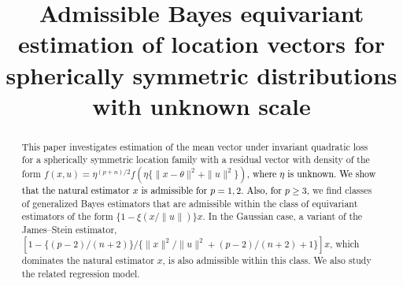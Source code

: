 \documentclass[preprint,11pt]{imsart}
\numberwithin{equation}{section}
\theoremstyle{plain}
\theoremstyle{definition}
\theoremstyle{remark}
\newcommand{\AKA}[1]{\textcolor{black}{#1}}
\begin{document}
\begin{frontmatter}
 \title{Admissible Bayes equivariant estimation of location vectors for spherically symmetric
distributions with unknown scale}


\begin{abstract}
 This paper investigates estimation of the mean vector under invariant quadratic loss 
 for a spherically symmetric location family with a residual vector with density
 of the form $ f(x,u)=\eta^{(p+n)/2}f(\eta\{\|x-\theta\|^2+\|u\|^2\})$\AKA{, where $\eta$ is unknown.
We show that the natural estimator $x$ is admissible for $p=1,2$. Also, for $p\geq 3$,}
we find classes of generalized Bayes estimators that are admissible
 within the class of equivariant estimators of the form
 $\{1-\xi(x/\|u\|)\}x$.
 In the Gaussian case,
 a variant of the James--Stein estimator, $[1-\{(p-2)/(n+2)\}/\{\|x\|^2/\|u\|^2+(p-2)/(n+2)+1\}]x$,
which dominates the natural estimator $x$, is also admissible within this class.
 We also study the related regression model.
 \end{abstract}

\begin{keyword}[class=AMS]
\end{keyword}

\begin{keyword}
\end{keyword}
\end{frontmatter}
\end{document}

